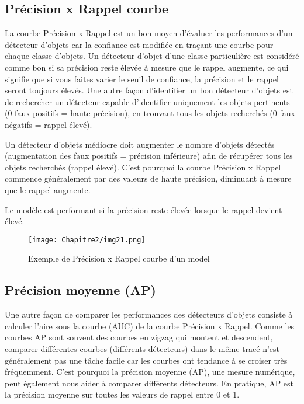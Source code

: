          \subsection{Précision x Rappel courbe}
          La courbe Précision x Rappel est un bon moyen d'évaluer les performances d'un détecteur d'objets car la confiance est modifiée en traçant une courbe pour chaque classe d'objets. Un détecteur d'objet d'une classe particulière est considéré comme bon si sa précision reste élevée à mesure que le rappel augmente, ce qui signifie que si vous faites varier le seuil de confiance, la précision et le rappel seront toujours élevés. Une autre façon d'identifier un bon détecteur d'objets est de rechercher un détecteur capable d'identifier uniquement les objets pertinents (0 faux positifs = haute précision), en trouvant tous les objets recherchés (0 faux négatifs = rappel élevé).
          
          Un détecteur d'objets médiocre doit augmenter le nombre d'objets détectés (augmentation des faux positifs = précision inférieure) afin de récupérer tous les objets recherchés (rappel élevé). C'est pourquoi la courbe Précision x Rappel commence généralement par des valeurs de haute précision, diminuant à mesure que le rappel augmente.
          
          Le modèle est performant si la précision reste élevée lorsque le rappel devient élevé.
          \begin{figure}[H]
               \centering
               \texttt{[image: Chapitre2/img21.png]}
               \caption{Exemple de Précision x Rappel courbe d'un model}
               \label{img21}
               \end{figure}
          
          \subsection{Précision moyenne (AP)}
          Une autre façon de comparer les performances des détecteurs d'objets consiste à calculer l'aire sous la courbe (AUC) de la courbe Précision x Rappel. Comme les courbes AP sont souvent des courbes en zigzag qui montent et descendent, comparer différentes courbes (différents détecteurs) dans le même tracé n'est généralement pas une tâche facile car les courbes ont tendance à se croiser très fréquemment. C'est pourquoi la précision moyenne (AP), une mesure numérique, peut également nous aider à comparer différents détecteurs. En pratique, AP est la précision moyenne sur toutes les valeurs de rappel entre 0 et 1.
          
